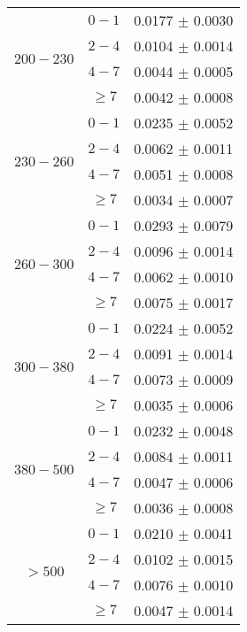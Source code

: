 \begin{table}[h!]
\begin{tabular}{c|c|c}
\multirow{4}{*}{$200-230$} & $0-1$    & 0.0177 $\pm$ 0.0030 \\      
                          & $2-4$     & 0.0104 $\pm$ 0.0014 \\      
                          & $4-7$     & 0.0044 $\pm$ 0.0005 \\      
                          & $\geq 7$  & 0.0042 $\pm$ 0.0008 \\\hline
\multirow{4}{*}{$230-260$} & $0-1$    & 0.0235 $\pm$ 0.0052 \\      
                          & $2-4$     & 0.0062 $\pm$ 0.0011 \\      
                          & $4-7$     & 0.0051 $\pm$ 0.0008 \\      
                          & $\geq 7$  & 0.0034 $\pm$ 0.0007 \\\hline
\multirow{4}{*}{$260-300$} & $0-1$    & 0.0293 $\pm$ 0.0079 \\      
                          & $2-4$     & 0.0096 $\pm$ 0.0014 \\      
                          & $4-7$     & 0.0062 $\pm$ 0.0010 \\      
                          & $\geq 7$  & 0.0075 $\pm$ 0.0017 \\\hline
\multirow{4}{*}{$300-380$} & $0-1$    & 0.0224 $\pm$ 0.0052 \\      
                          & $2-4$     & 0.0091 $\pm$ 0.0014 \\      
                          & $4-7$     & 0.0073 $\pm$ 0.0009 \\      
                          & $\geq 7$  & 0.0035 $\pm$ 0.0006 \\\hline
\multirow{4}{*}{$380-500$} & $0-1$    & 0.0232 $\pm$ 0.0048 \\      
                          & $2-4$     & 0.0084 $\pm$ 0.0011 \\      
                          & $4-7$     & 0.0047 $\pm$ 0.0006 \\      
                          & $\geq 7$  & 0.0036 $\pm$ 0.0008 \\\hline
\multirow{4}{*}{$> 500$}   & $0-1$    & 0.0210 $\pm$ 0.0041 \\      
                          & $2-4$     & 0.0102 $\pm$ 0.0015 \\      
                          & $4-7$     & 0.0076 $\pm$ 0.0010 \\      
                          & $\geq 7$  & 0.0047 $\pm$ 0.0014 \\\hline
\end{tabular}                                 
\end{table}
